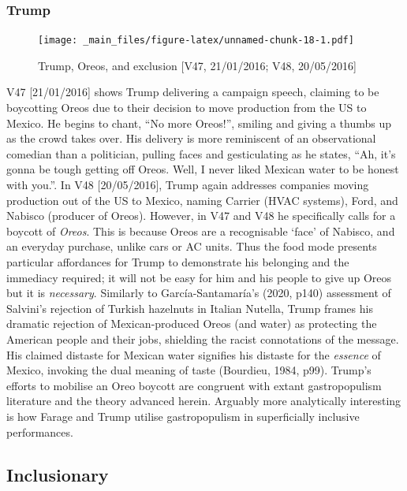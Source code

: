 \documentclass[a4paper, nobind]{templates/ociamthesis}
\begin{document}
\hypertarget{trump-1}{%
\subsubsection*{Trump}\label{trump-1}}

\begin{figure}
\centering
\texttt{[image: \_main\_files/figure-latex/unnamed-chunk-18-1.pdf]}
\caption{\label{fig:unnamed-chunk-18}Trump, Oreos, and exclusion {[}V47, 21/01/2016; V48, 20/05/2016{]}}
\end{figure}

V47 {[}21/01/2016{]} shows Trump delivering a campaign speech, claiming to be boycotting Oreos due to their decision to move production from the US to Mexico.
He begins to chant, ``No more Oreos!'', smiling and giving a thumbs up as the crowd takes over.
His delivery is more reminiscent of an observational comedian than a politician, pulling faces and gesticulating as he states, ``Ah, it's gonna be tough getting off Oreos. Well, I never liked Mexican water to be honest with you.''.
In V48 {[}20/05/2016{]}, Trump again addresses companies moving production out of the US to Mexico, naming Carrier (HVAC systems), Ford, and Nabisco (producer of Oreos).
However, in V47 and V48 he specifically calls for a boycott of \emph{Oreos}.
This is because Oreos are a recognisable `face' of Nabisco, and an everyday purchase, unlike cars or AC units.
Thus the food mode presents particular affordances for Trump to demonstrate his belonging and the immediacy required; it will not be easy for him and his people to give up Oreos but it is \emph{necessary}.
Similarly to García-Santamaría's (2020, p140) assessment of Salvini's rejection of Turkish hazelnuts in Italian Nutella, Trump frames his dramatic rejection of Mexican-produced Oreos (and water) as protecting the American people and their jobs, shielding the racist connotations of the message.
His claimed distaste for Mexican water signifies his distaste for the \emph{essence} of Mexico, invoking the dual meaning of taste (Bourdieu, 1984, p99).
Trump's efforts to mobilise an Oreo boycott are congruent with extant gastropopulism literature and the theory advanced herein.
Arguably more analytically interesting is how Farage and Trump utilise gastropopulism in superficially inclusive performances.

\hypertarget{inclusionary}{%
\subsection{Inclusionary}\label{inclusionary}}
\end{document}
